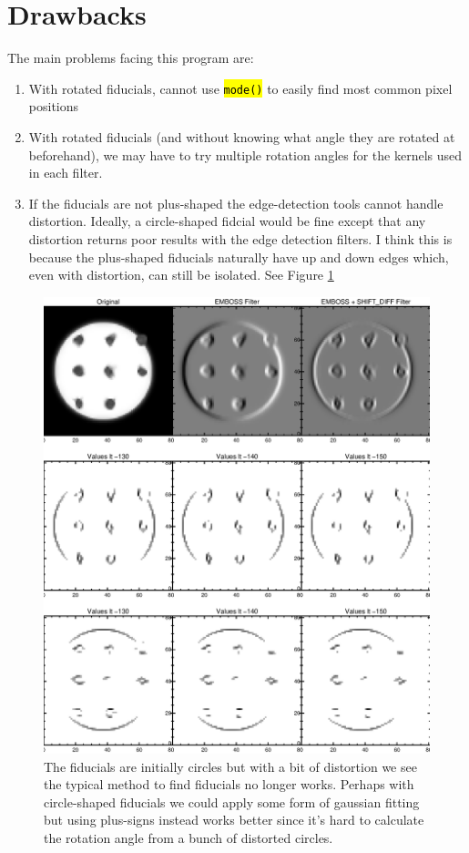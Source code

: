 \documentclass[10pt]{article}
\begin{document}
\newpage

\section{Drawbacks}

    The main problems facing this program are:

    \begin{enumerate}
        \item With rotated fiducials, cannot use \hl{\texttt{mode()}} to easily find most common pixel positions
        \item With rotated fiducials (and without knowing what angle they are rotated at beforehand), we may have to try multiple rotation angles for the kernels used in each filter.
        \item If the fiducials are not plus-shaped the edge-detection tools cannot handle distortion. Ideally, a circle-shaped fidcial would be fine except that any distortion returns poor results with the edge detection filters. I think this is because the plus-shaped fiducials naturally have up and down edges which, even with distortion, can still be isolated. See Figure \ref{circfidcomp}
    \end{enumerate}

\begin{figure}
    \centering
    \includegraphics[width=.9\textwidth]{plots_tables_images/circfidcomp.eps}
    \caption{The fiducials are initially circles but with a bit of distortion we see the typical method to find fiducials no longer works. Perhaps with circle-shaped fiducials we could apply some form of gaussian fitting but using plus-signs instead works better since it's hard to calculate the rotation angle from a bunch of distorted circles.}
    \label{circfidcomp}
\end{figure}
\end{document}
